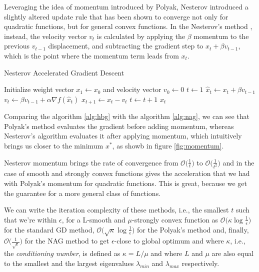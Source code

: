 Leveraging the idea of momentum introduced by Polyak, Nesterov introduced a slightly altered update rule that has been shown to converge not only for quadratic functions, but for general convex functions. In the Nesterov's method \cite{nesterov1998introductory}, instead, the velocity vector $v_t$ is calculated by applying the $\beta$ momentum to the previous $v_{t-1}$ displacement, and subtracting the gradient step to $x_t + \beta v_{t-1}$, which is the point where the momentum term leads from $x_t$.

\begin{algorithm}[H]
	\caption{Nesterov Accelerated Gradient Descent}
	\label{alg:nag}
	\begin{algorithmic}
		\Require{Momentum $\beta \in [0,1)$}
			\State Initialize weight vector $x_1 \gets x_0$ and velocity vector $v_0 \gets 0$
			\State $t \gets 1$
				\State $\hat{x}_t \gets x_t + \beta v_{t-1}$
				\State $v_t \gets \beta v_{t-1} + \alpha \nabla f(\hat{x}_t)$
				\State $x_{t+1} \gets x_t - v_t$
				\State $t \gets t + 1$
			\EndWhile
			\State \Return $x_t$
		\EndFunction
	\end{algorithmic}
\end{algorithm}

Comparing the algorithm \ref{alg:hbg} with the algorithm \ref{alg:nag}, we can see that Polyak’s method evaluates the gradient before adding momentum, whereas Nesterov’s algorithm evaluates it after applying momentum, which intuitively brings us closer to the minimum $x^*$, as showb in figure \ref{fig:momentum}.

Nesterov momentum brings the rate of convergence from $\displaystyle \mathcal{O}\Big(\frac{1}{t}\Big)$ to $\displaystyle \mathcal{O}\Big(\frac{1}{t^2}\Big)$ and in the case of smooth and strongly convex functions gives the acceleration that we had with Polyak’s momentum for quadratic functions. This is great, because we get the guarantee for a more general class of functions.

\bigskip

We can write the iteration complexity of these methods, i.e., the smallest $t$ such that we’re within $\epsilon$, for a L-smooth and $\mu$-strongly convex function as $\displaystyle \mathcal{O}\Big(\kappa \log \frac{1}{\epsilon}\Big)$ for the standard GD method, $\displaystyle \mathcal{O}\Big(\sqrt{\kappa}\log \frac{1}{\epsilon}\Big)$ for the Polyak’s method and, finally, $\displaystyle \mathcal{O}\Big(\frac{1}{\sqrt{\epsilon}}\Big)$ for the NAG method to get $\epsilon$-close to global optimum and where $\kappa$, i.e., the \emph{conditioning number}, is defined as $\kappa = L/\mu$ and where $L$ and $\mu$ are also equal to the smallest and the largest eigenvalues $\lambda_{min}$ and $\lambda_{max}$ respectively.

